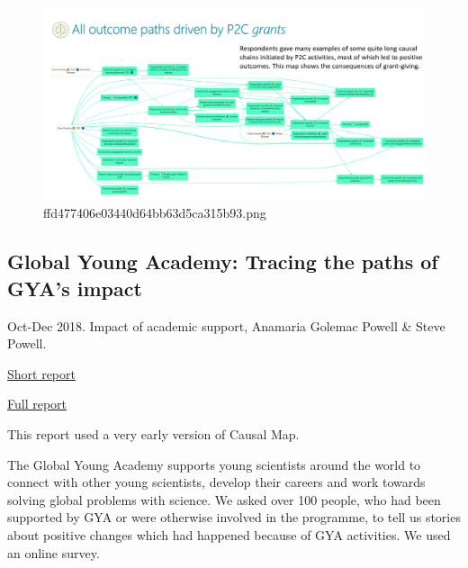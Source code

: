 \documentclass[
]{book}
\begin{document}
\begin{figure}
\centering
\includegraphics{_assets/ffd477406e03440d64bb63d5ca315b93.png}
\caption{ffd477406e03440d64bb63d5ca315b93.png}
\end{figure}

\hypertarget{global-young-academy-tracing-the-paths-of-gyas-impact}{%
\subsection{Global Young Academy: Tracing the paths of GYA's impact}\label{global-young-academy-tracing-the-paths-of-gyas-impact}}

Oct-Dec 2018. Impact of academic support, Anamaria Golemac Powell \& Steve Powell.

\href{https://globalyoungacademy.net/wp-content/uploads/2019/04/GYA-Impact-Analysis-2018_Final.pdf}{Short report}

\href{https://globalyoungacademy.net/wp-content/uploads/2019/04/GYA-Impact-Analyisis-2018-Technical-Appendix.pdf}{Full report}

This report used a very early version of Causal Map.

The Global Young Academy supports young scientists around the world to connect with
other young scientists, develop their careers and work towards solving global problems
with science. We asked over 100 people, who had been supported by GYA or were
otherwise involved in the programme, to tell us stories about positive changes which had
happened because of GYA activities. We used an online survey.
\end{document}
